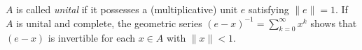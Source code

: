 $A$ is called \emph{unital} if it possesses a (multiplicative) unit $e$ satisfying $\|e\| = 1$. If $A$ is unital and complete, the geometric series $(e - x)^{-1} = \sum_{k=0}^{\infty} x^k$ shows that $(e - x)$ is invertible for each $x \in A$ with $\|x\| < 1$.
